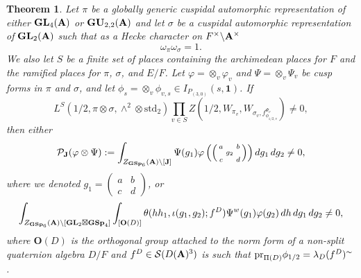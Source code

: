 \documentclass[11pt, reqno]{amsart}
\theoremstyle{plain}
\newtheorem{theorem}{Theorem}[section]
\theoremstyle{definition}
\theoremstyle{remark}
\theoremstyle{plain}
\def\A{{\bf A}}
\def\GSp{{\mathbf{GSp}}}
\def\GU{{\mathbf{GU}}}
\def\GL{\mathbf{GL}}
\begin{document}
\begin{theorem}\label{Final:Theorem:Central:Value}
    Let $\pi$ be a globally generic cuspidal automorphic representation of either $\GL_4(\A)$ or $\GU_{2,2}(\A)$ and let $\sigma$ be a cuspidal automorphic representation of $\GL_2(\A)$ such that as a Hecke character on $F^\times \backslash \A^\times$ \begin{equation*}
    \omega_\pi \omega_\sigma = 1.
\end{equation*}
We also let $S$ be a finite set of places containing the archimedean places for $F$ and the ramified places for $\pi$, $\sigma$, and $E/F$. Let $\varphi = \otimes_v \varphi_v$ and $\Psi = \otimes_v \Psi_v$ be cusp forms in $\pi$ and $\sigma$, and let  $\phi_{s} = \otimes_v \phi_{v,s} \in I_{P_{(3,0)}}(s,\mathbf{1})$. If 
$$ L^S(1/2, \pi \otimes \sigma, \wedge^2 \otimes  \mathrm{std}_2) \prod_{v \in S} Z\left(1/2,W_{\pi_v}, W_{\sigma_v,f_{\phi_{1/2,v}}^{\Psi_v}} \right) \ne 0,$$ then either 
\begin{align}
\mathcal{P}_{\mathbf{J}}( \varphi \otimes \Psi) : = \int_{Z_{\GSp_6}(\A)  \backslash[ \mathbf{J}]} \Psi(g_1) \varphi\left( \left(\begin{smallmatrix}
    a& &b\\ &g_2& \\ c& &d
\end{smallmatrix}\right) \right )  dg_1 \, dg_2 \ne 0,  
\end{align}
 where we denoted $g_1 = \left(\begin{smallmatrix}a&b\\c&d\end{smallmatrix}\right)$, or 
\begin{align}\label{FormulaWithTheta}
    \int_{Z_{\GSp_6}(\A)\backslash [\GL_2\boxtimes \GSp_4]} \int_{[\mathbf{O}(D)]} \theta(h h_1, \iota( g_1  , g_2) ; f^D) \Psi^w( g_1 ) \varphi(g_2) \, d h \, dg_1\,dg_2 \ne 0,
\end{align}
where $\mathbf{O}(D)$ is the orthogonal group attached to the norm form of a non-split quaternion algebra $D/F$ and $f^D \in \mathcal{S}(D(\A)^3)$ is such that ${\rm pr}_{\Pi(D)} \phi_{1/2}  = \lambda_D(f^D)^{\sim}$. 
\end{theorem}
   
\end{document}
